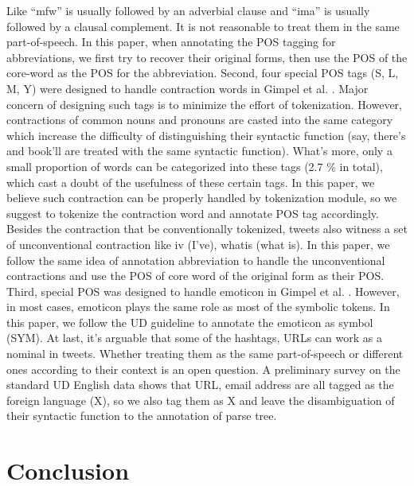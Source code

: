 \documentclass[11pt,letterpaper]{article}
\begin{document}
Like ``mfw'' is usually followed by an adverbial clause and ``ima'' is usually followed by a clausal complement. 
It is not reasonable to treat them in the same part-of-speech. 
In this paper, when annotating the POS tagging for abbreviations, we first try to recover their original forms, then use the POS of the core-word as the POS for the abbreviation.
Second, four special POS tags (S, L, M, Y) were designed to handle contraction words in Gimpel et al. . Major concern of designing such tags is to minimize the effort of tokenization. 
However, contractions of common nouns and pronouns are casted into the same category which increase the difficulty of distinguishing their syntactic function (say, there's and book'll are treated with the same syntactic function). What's more, only a small proportion of words can be categorized into these tags (2.7 \% in total), which cast a doubt of the usefulness of these certain tags. In this paper, we believe such contraction can be properly handled by tokenization module, so we suggest to tokenize the contraction word and annotate POS tag accordingly.
Besides the contraction that be conventionally tokenized, tweets also witness a set of unconventional contraction like iv (I've), whatis (what is). In this paper, we follow the same idea of annotation abbreviation to handle the unconventional contractions and use the POS of core word of the original form as their POS.
Third, special POS was designed to handle emoticon in Gimpel et al. . However, in most cases, emoticon plays the same role as most of the symbolic tokens. In this paper, we follow the UD guideline to annotate the emoticon as symbol (SYM).
At last, it’s arguable that some of the hashtags, URLs can work as a nominal in tweets. Whether treating them as the same part-of-speech or different ones according to their context is an open question. A preliminary survey on the standard UD English data shows that URL, email address are all tagged as the foreign language (X), so we also tag them as X and leave the disambiguation of their syntactic function to the annotation of parse tree.

\section{Conclusion}





\end{document}
